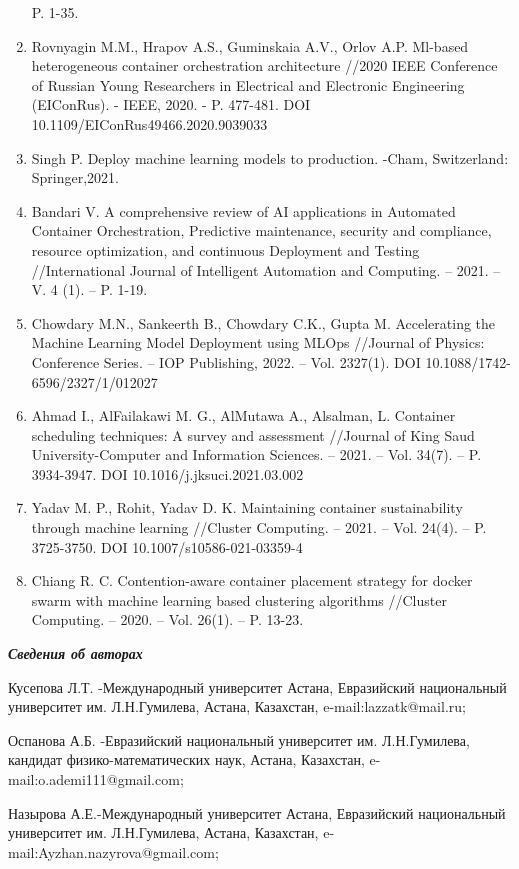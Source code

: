 \begin{enumerate}
  P. 1-35.
\item
  Rovnyagin M.M., Hrapov A.S., Guminskaia A.V., Orlov A.P. Ml-based
  heterogeneous container orchestration architecture //2020 IEEE
  Conference of Russian Young Researchers in Electrical and Electronic
  Engineering (EIConRus). - IEEE, 2020. - P. 477-481. DOI
  10.1109/EIConRus49466.2020.9039033
\item
  Singh P. Deploy machine learning models to production. -Cham,
  Switzerland: Springer,2021.
\item
  Bandari V. A comprehensive review of AI applications in Automated
  Container Orchestration, Predictive maintenance, security and
  compliance, resource optimization, and continuous Deployment and
  Testing //International Journal of Intelligent Automation and
  Computing. -- 2021. -- V. 4 (1). -- P. 1-19.
\item
  Chowdary M.N., Sankeerth B., Chowdary C.K., Gupta M. Accelerating the
  Machine Learning Model Deployment using MLOps //Journal of Physics:
  Conference Series. -- IOP Publishing, 2022. -- Vol. 2327(1). DOI
  10.1088/1742-6596/2327/1/012027
\item
  Ahmad I., AlFailakawi M. G., AlMutawa A., Alsalman, L. Container
  scheduling techniques: A survey and assessment //Journal of King Saud
  University-Computer and Information Sciences. -- 2021. -- Vol. 34(7).
  -- P. 3934-3947. DOI 10.1016/j.jksuci.2021.03.002
\item
  Yadav M. P., Rohit, Yadav D. K. Maintaining container sustainability
  through machine learning //Cluster Computing. -- 2021. -- Vol. 24(4).
  -- P. 3725-3750. DOI 10.1007/s10586-021-03359-4
\item
  Chiang R. C. Contention-aware container placement strategy for docker
  swarm with machine learning based clustering algorithms //Cluster
  Computing. -- 2020. -- Vol. 26(1). -- P. 13-23.
\end{enumerate}

\emph{\textbf{Сведения об авторах}}

Кусепова Л.Т. -Международный университет Астана, Евразийский
национальный университет им. Л.Н.Гумилева, Астана, Казахстан,
e-mail:lazzatk@mail.ru;

Оспанова А.Б. -Евразийский национальный университет им. Л.Н.Гумилева,
кандидат физико-математических наук, Астана, Казахстан,
e-mail:o.ademi111@gmail.com;

Назырова А.Е.-Международный университет Астана, Евразийский национальный
университет им. Л.Н.Гумилева, Астана, Казахстан,
e-mail:Ayzhan.nazyrova@gmail.com;

